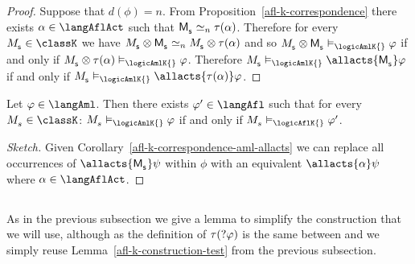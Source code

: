 \begin{proof}
    Suppose that $d(\phi) = n$.
    From Proposition~\ref{afl-k-correspondence} there exists $\alpha \in \langAflAct$ such that $\aPModel{\aStateS} \bisimilar[n] \tau(\alpha)$.
    Therefore for every $\kPModel{\aStateS} \in \classK$ we have $\kPModel{\aStateS} \exec \aPModel{\aStateS} \bisimilar[n] \kPModel{\aStateS} \exec \tau(\alpha)$ and so $\kPModel{\aStateS} \exec \aPModel{\aStateS} \entails_\logicAmlK{} \phi$ if and only if $\kPModel{\aStateS} \exec \tau(\alpha) \entails_\logicAmlK{} \phi$.
    Therefore $\kPModel{\aStateS} \entails_\logicAmlK{} \allacts{\aPModel{\aStateS}}  \phi$ if and only if $\kPModel{\aStateS} \entails_\logicAmlK{} \allacts{\tau(\alpha)}  \phi$.
\end{proof}

\begin{corollary}\label{afl-k-correspondence-afl-aml}
    Let $\phi \in \langAml$. 
    Then there exists $\phi' \in \langAfl$ such that for every $\kPModel{\kStateS} \in \classK$: $\kPModel{\kStateS} \entails_\logicAmlK{} \phi$ if and only if $\kPModel{\kStateS} \entails_\logicAflK{} \phi'$.
\end{corollary}

\begin{proof}[Sketch]
    Given Corollary~\ref{afl-k-correspondence-aml-allacts} we can replace all occurrences of $\allacts{\aPModel{\aStateS}} \psi$ within $\phi$ with an equivalent $\allacts{\alpha} \psi$ where $\alpha \in \langAflAct$.
\end{proof}

\subsection{\classKFF{}}

As in the previous subsection we give a lemma to simplify the construction that we will use, although as the definition of $\tau(?{\varphi})$ is the same between \classK{} and \classKFF{} we simply reuse Lemma~\ref{afl-k-construction-test} from the previous subsection.

